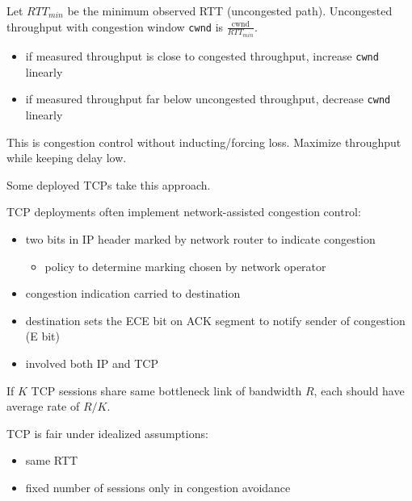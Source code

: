 \documentclass[11pt]{article}
\begin{document}
Let \(RTT_{min}\) be the minimum observed RTT (uncongested path).
Uncongested throughput with congestion window \texttt{cwnd} is \(\frac{\text{cwnd}}{RTT_{min}}\).
\begin{itemize}
\item if measured throughput is close to congested throughput, increase \texttt{cwnd} linearly
\item if measured throughput far below uncongested throughput, decrease \texttt{cwnd} linearly
\end{itemize}

This is congestion control without inducting/forcing loss.
Maximize throughput while keeping delay low.

Some deployed TCPs take this approach.

TCP deployments often implement network-assisted congestion control:
\begin{itemize}
\item two bits in IP header marked by network router to indicate congestion
\begin{itemize}
\item policy to determine marking chosen by network operator
\end{itemize}
\item congestion indication carried to destination
\item destination sets the ECE bit on ACK segment to notify sender of congestion (E bit)
\item involved both IP and TCP
\end{itemize}

If \(K\) TCP sessions share same bottleneck link of bandwidth \(R\), each should have
average rate of \(R/K\).

TCP is fair under idealized assumptions:
\begin{itemize}
\item same RTT
\item fixed number of sessions only in congestion avoidance
\end{itemize}
\end{document}
